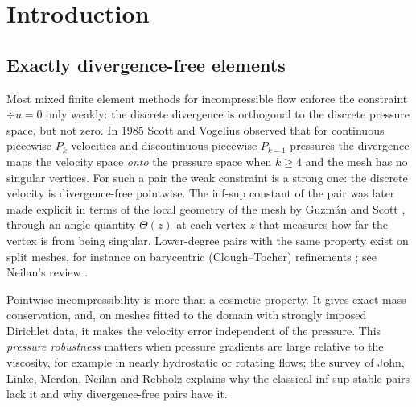 \section{Introduction}\label{sec:intro}

\subsection{Exactly divergence-free elements}
Most mixed finite element methods for incompressible flow enforce the constraint $\div u=0$ only weakly: the discrete divergence is orthogonal to the discrete pressure space, but not zero. In 1985 Scott and Vogelius \cite{ScottVogelius1985} observed that for continuous piecewise-$P_k$ velocities and discontinuous piecewise-$P_{k-1}$ pressures the divergence maps the velocity space \emph{onto} the pressure space when $k\ge4$ and the mesh has no singular vertices. For such a pair the weak constraint is a strong one: the discrete velocity is divergence-free pointwise. The inf-sup constant of the pair was later made explicit in terms of the local geometry of the mesh by Guzm\'an and Scott \cite{GuzmanScott2019}, through an angle quantity $\Theta(z)$ at each vertex $z$ that measures how far the vertex is from being singular. Lower-degree pairs with the same property exist on split meshes, for instance on barycentric (Clough--Tocher) refinements \cite{ArnoldQin1992,GuzmanNeilan2018}; see Neilan's review \cite{Neilan2020}.

Pointwise incompressibility is more than a cosmetic property. It gives exact mass conservation, and, on meshes fitted to the domain with strongly imposed Dirichlet data, it makes the velocity error independent of the pressure. This \emph{pressure robustness} matters when pressure gradients are large relative to the viscosity, for example in nearly hydrostatic or rotating flows; the survey of John, Linke, Merdon, Neilan and Rebholz \cite{JohnEtAl2017} explains why the classical inf-sup stable pairs lack it and why divergence-free pairs have it.


